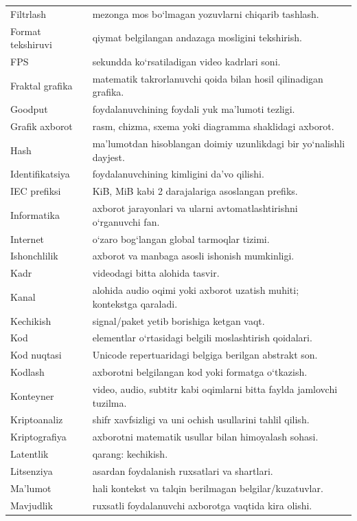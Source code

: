 \documentclass[11pt,a4paper,oneside]{book}
\begin{document}
\begin{longtable}{@{}L{38mm}L{127mm}@{}}
Filtrlash & mezonga mos bo‘lmagan yozuvlarni chiqarib tashlash.\\
Format tekshiruvi & qiymat belgilangan andazaga mosligini tekshirish.\\
FPS & sekundda ko‘rsatiladigan video kadrlari soni.\\
Fraktal grafika & matematik takrorlanuvchi qoida bilan hosil qilinadigan grafika.\\
Goodput & foydalanuvchining foydali yuk ma’lumoti tezligi.\\
Grafik axborot & rasm, chizma, sxema yoki diagramma shaklidagi axborot.\\
Hash & ma’lumotdan hisoblangan doimiy uzunlikdagi bir yo‘nalishli dayjest.\\
Identifikatsiya & foydalanuvchining kimligini da’vo qilishi.\\
IEC prefiksi & KiB, MiB kabi 2 darajalariga asoslangan prefiks.\\
Informatika & axborot jarayonlari va ularni avtomatlashtirishni o‘rganuvchi fan.\\
Internet & o‘zaro bog‘langan global tarmoqlar tizimi.\\
Ishonchlilik & axborot va manbaga asosli ishonish mumkinligi.\\
Kadr & videodagi bitta alohida tasvir.\\
Kanal & alohida audio oqimi yoki axborot uzatish muhiti; kontekstga qaraladi.\\
Kechikish & signal/paket yetib borishiga ketgan vaqt.\\
Kod & elementlar o‘rtasidagi belgili moslashtirish qoidalari.\\
Kod nuqtasi & Unicode repertuaridagi belgiga berilgan abstrakt son.\\
Kodlash & axborotni belgilangan kod yoki formatga o‘tkazish.\\
Konteyner & video, audio, subtitr kabi oqimlarni bitta faylda jamlovchi tuzilma.\\
Kriptoanaliz & shifr xavfsizligi va uni ochish usullarini tahlil qilish.\\
Kriptografiya & axborotni matematik usullar bilan himoyalash sohasi.\\
Latentlik & qarang: kechikish.\\
Litsenziya & asardan foydalanish ruxsatlari va shartlari.\\
Ma’lumot & hali kontekst va talqin berilmagan belgilar/kuzatuvlar.\\
Mavjudlik & ruxsatli foydalanuvchi axborotga vaqtida kira olishi.\\

\end{longtable}
\end{document}

